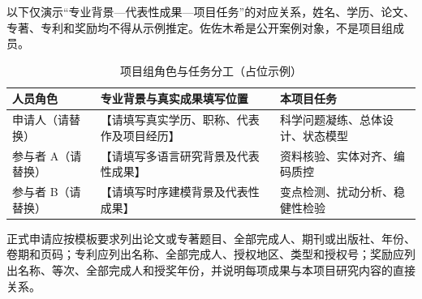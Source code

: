 \GXNSFBodyText

以下仅演示“专业背景—代表性成果—项目任务”的对应关系，姓名、学历、论文、专著、专利和奖励均不得从示例推定。佐佐木希是公开案例对象，不是项目组成员。

\begin{table}[htbp]
  \centering
  \fontsize{10}{14}\selectfont
  \caption{项目组角色与任务分工（占位示例）}
  \begin{tabularx}{\textwidth}{p{}X X}
    \toprule
    人员角色 & 专业背景与真实成果填写位置 & 本项目任务 \\
    \midrule
    申请人（请替换） & 【请填写真实学历、职称、代表作及项目经历】 & 科学问题凝练、总体设计、状态模型 \\
    参与者 A（请替换） & 【请填写多语言研究背景及代表性成果】 & 资料核验、实体对齐、编码质控 \\
    参与者 B（请替换） & 【请填写时序建模背景及代表性成果】 & 变点检测、扰动分析、稳健性检验 \\
    \bottomrule
  \end{tabularx}
  \label{tab:gx-team-role}
\end{table}

正式申请应按模板要求列出论文或专著题目、全部完成人、期刊或出版社、年份、卷期和页码；专利应列出名称、全部完成人、授权地区、类型和授权号；奖励应列出名称、等次、全部完成人和授奖年份，并说明每项成果与本项目研究内容的直接关系。
